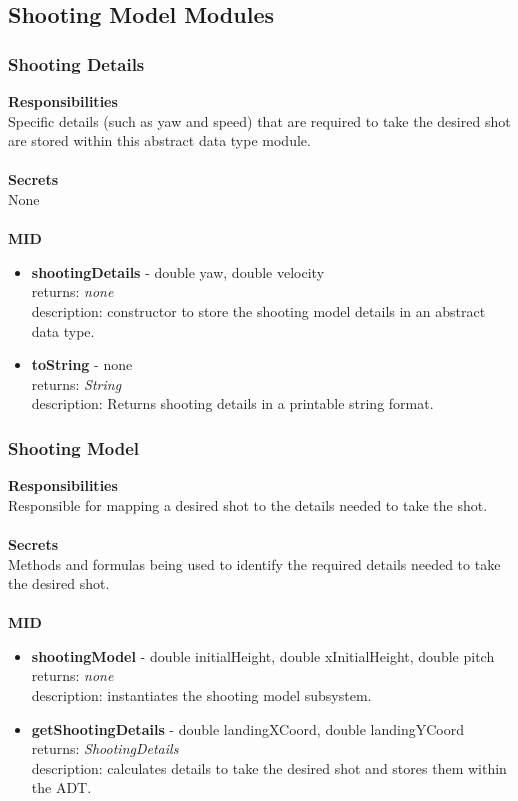 \documentclass[11pt]{article}
\begin{document}
\subsection{Shooting Model Modules}
\subsubsection*{Shooting Details}
\textbf{Responsibilities} \\
Specific details (such as yaw and speed) that are required to take the desired shot are stored within this abstract data type module. \\ \\
\textbf{Secrets} \\ 
None \\  \\
\textbf{MID} 
\begin{itemize}
\item \textbf{shootingDetails} - double  yaw, double velocity \\ returns: \textit{none} \\ description: constructor to store the shooting model details in an abstract data type.
\item \textbf{toString} - none \\ returns: \textit{String} \\ description: Returns shooting details in a printable string format.
\end{itemize}
\subsubsection*{Shooting Model}
\textbf{Responsibilities} \\
Responsible for mapping a desired shot to the details needed to take the shot. \\ \\
\textbf{Secrets} \\ 
Methods and formulas being used to identify the required details needed to take the desired shot. \\  \\
\textbf{MID} 
\begin{itemize}
\item \textbf{shootingModel} - double  initialHeight, double xInitialHeight, double pitch \\ returns: \textit{none} \\ description: instantiates the shooting model subsystem.
\item \textbf{getShootingDetails} - double landingXCoord, double landingYCoord \\ returns: \textit{ShootingDetails} \\ description: calculates details to take the desired shot and stores them within the ADT.
\end{itemize}
\end{document}
